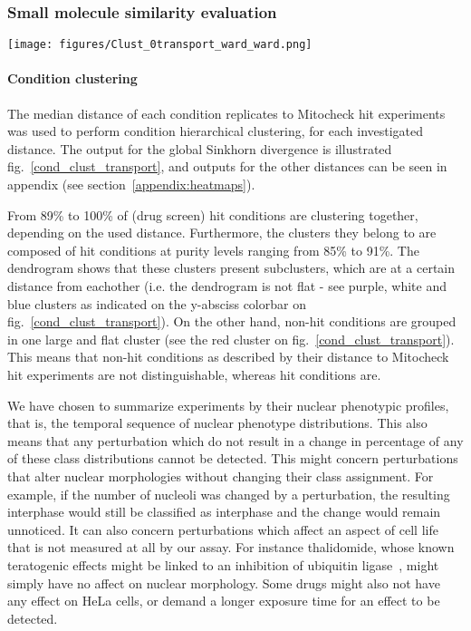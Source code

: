 \subsubsection{Small molecule similarity evaluation}

\begin{figure*}[ht!]
\centerline{\texttt{[image: figures/Clust\_0transport\_ward\_ward.png]}}

\caption{Drug screen condition - Mitocheck siRNA two-dimensional hierarchical clustering using global Sinkhorn divergence. Ward method was used in combination with the Euclidean distance.}
\label{cond_clust_transport}
\end{figure*}

\paragraph*{Condition clustering\\}
The median distance of each condition replicates to Mitocheck hit
experiments was used to perform condition hierarchical clustering, for
each investigated distance. The output for the global Sinkhorn
divergence is illustrated fig.~\ref{cond_clust_transport}, and outputs
for the other distances can be seen in appendix (see
section~\ref{appendix:heatmaps}). 

From 89\% to 100\% of (drug screen) hit conditions are clustering
together, depending on the used distance. Furthermore, the clusters
they belong to are composed of hit conditions at purity levels ranging
from 85\% to 91\%. The dendrogram shows that these clusters present
subclusters, which are at a certain distance from eachother (i.e. the
dendrogram is not flat - see purple, white and blue clusters as
indicated on the y-absciss colorbar on
fig.~\ref{cond_clust_transport}). On the other hand, non-hit
conditions are grouped in one large and flat cluster (see the red
cluster on fig.~\ref{cond_clust_transport}). This means that non-hit
conditions as described by their distance to Mitocheck hit experiments
are not distinguishable, whereas hit conditions are. 

We have chosen to summarize experiments by their nuclear phenotypic
profiles, that is, the temporal sequence of nuclear phenotype
distributions. This also means that any perturbation which do not result in
a change in percentage of any of these class distributions cannot be
detected. This might concern perturbations that alter nuclear
morphologies without changing their class assignment. For example, if the number of nucleoli was changed by a perturbation, the resulting interphase would still be classified as interphase and the change would remain unnoticed. It can also concern perturbations which affect an aspect of cell life that is
not measured at all by our assay. For instance thalidomide, whose known teratogenic
effects might be linked to an inhibition of ubiquitin ligase~\cite{pmid20223979}, might simply have no affect on nuclear morphology. Some drugs might also not have any effect on HeLa cells, or demand a longer exposure time for an effect to be detected. 

